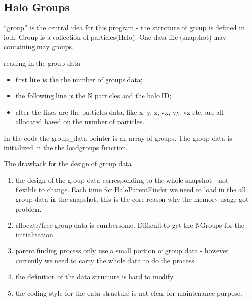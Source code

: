 \documentclass[notheorems, aspectratio=54]{beamer}
\begin{document}
\subsection{Halo Groups}
\begin{frame}

``group'' is the central idea for this program - the structure of group is defined in io.h. Group is a collection of particles(Halo). One data file (snapshot)
may containing may groups.

\begin{block}{reading in the group data}
 \begin{itemize}
  \item first line is the the number of groups data;
  \item the following line is the N particles and the halo ID;
  \item after the lines are the particles data, like  x, y, z, vx, vy, vz etc. are all allocated based on the number of particles.
 \end{itemize}
\end{block}


In the code the group\_data pointer is an array of groups. The group data is initialized in the  the loadgroups
function.


\end{frame}

\begin{frame}

\begin{block}{The drawback for the design of group data}
  \begin{enumerate}
   \item the design of the group data corresponding to the whole snapshot - not flexible to change. Each time for HaloParentFinder
   we need to load in the all group data in the snapshot, this is the core reason why the memory usage got problem. 
   \item allocate/free group data is cumbersome. Difficult to get the NGroups for the initialization.
   \item parent finding process only use a small portion of group data - however currently we need to carry the whole data 
   to do the process.
   \item the definition of the data structure is hard to modify.
   \item the coding style for the data structure is not clear for maintenance purpose.
  \end{enumerate}
\end{block}

\end{frame}
\end{document}

